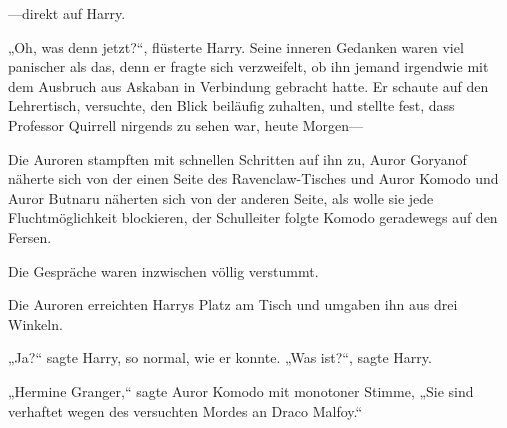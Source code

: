 —direkt auf Harry.

„Oh, was denn jetzt?“, flüsterte Harry. Seine inneren Gedanken waren viel panischer als das, denn er fragte sich verzweifelt, ob ihn jemand irgendwie mit dem Ausbruch aus Askaban in Verbindung gebracht hatte. Er schaute auf den Lehrertisch, versuchte, den Blick beiläufig zuhalten, und stellte fest, dass Professor Quirrell nirgends zu sehen war, heute Morgen—

Die Auroren stampften mit schnellen Schritten auf ihn zu, Auror Goryanof näherte sich von der einen Seite des Ravenclaw-Tisches und Auror Komodo und Auror Butnaru näherten sich von der anderen Seite, als wolle sie jede Fluchtmöglichkeit blockieren, der Schulleiter folgte Komodo geradewegs auf den Fersen.

Die Gespräche waren inzwischen völlig verstummt.

Die Auroren erreichten Harrys Platz am Tisch und umgaben ihn aus drei Winkeln.

„Ja?“ sagte Harry, so normal, wie er konnte. „Was ist?“, sagte Harry.

„Hermine Granger,“ sagte Auror Komodo mit monotoner Stimme, „Sie sind verhaftet wegen des versuchten Mordes an Draco Malfoy.“


